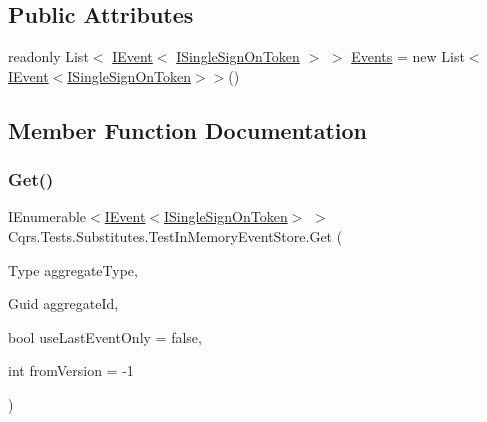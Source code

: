 \subsection*{Public Attributes}
\begin{DoxyCompactItemize}
\item 
readonly List$<$ \hyperlink{interfaceCqrs_1_1Events_1_1IEvent}{I\+Event}$<$ \hyperlink{interfaceCqrs_1_1Authentication_1_1ISingleSignOnToken}{I\+Single\+Sign\+On\+Token} $>$ $>$ \hyperlink{classCqrs_1_1Tests_1_1Substitutes_1_1TestInMemoryEventStore_add97988e933c2316c445bf4611c2d0ba}{Events} = new List$<$\hyperlink{interfaceCqrs_1_1Events_1_1IEvent}{I\+Event}$<$\hyperlink{interfaceCqrs_1_1Authentication_1_1ISingleSignOnToken}{I\+Single\+Sign\+On\+Token}$>$$>$()
\end{DoxyCompactItemize}


\subsection{Member Function Documentation}
\mbox{\label{classCqrs_1_1Tests_1_1Substitutes_1_1TestInMemoryEventStore_a45873558fbc3bc5eb1766ffc6fbead88}} 
\subsubsection{\texorpdfstring{Get()}{Get()}\hspace{0.1cm}{\footnotesize\ttfamily [1/2]}}
{\footnotesize\ttfamily I\+Enumerable$<$\hyperlink{interfaceCqrs_1_1Events_1_1IEvent}{I\+Event}$<$\hyperlink{interfaceCqrs_1_1Authentication_1_1ISingleSignOnToken}{I\+Single\+Sign\+On\+Token}$>$ $>$ Cqrs.\+Tests.\+Substitutes.\+Test\+In\+Memory\+Event\+Store.\+Get (\begin{DoxyParamCaption}\item[{Type}]{aggregate\+Type,  }\item[{Guid}]{aggregate\+Id,  }\item[{bool}]{use\+Last\+Event\+Only = {\ttfamily false},  }\item[{int}]{from\+Version = {\ttfamily -\/1} }\end{DoxyParamCaption})}

